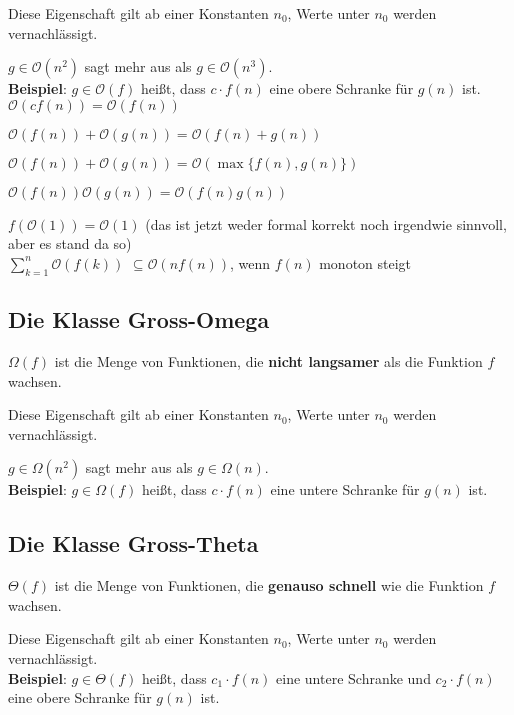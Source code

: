 \documentclass[12pt]{article}
\begin{document}
Diese Eigenschaft gilt ab einer Konstanten $n_0$, Werte unter $n_0$ werden vernachlässigt.

$g \in \mathcal O(n^2)$ sagt mehr aus als $g \in \mathcal O(n^3)$.\\

\textbf{Beispiel}: $g \in \mathcal O(f)$ heißt, dass $c \cdot{} f(n)$ eine obere Schranke für $g(n)$ ist.\\

$\mathcal O(cf(n)) = \mathcal O(f(n))$

$\mathcal O(f(n)) + \mathcal O(g(n)) = \mathcal O(f(n) + g(n))$

$\mathcal O(f(n)) + \mathcal O(g(n)) = \mathcal O(\max \{f(n), g(n)\})$

$\mathcal O(f(n))\mathcal O(g(n)) = \mathcal O(f(n)g(n))$

$f(\mathcal O(1)) = \mathcal O(1)$ (das ist jetzt weder formal korrekt noch irgendwie sinnvoll, aber es stand da so)\\

$\sum_{k=1}^n \mathcal O(f(k))$ $\subseteq \mathcal O(nf(n))$, wenn $f(n)$ monoton steigt

\subsection{Die Klasse Gross-Omega}

$\Omega(f)$ ist die Menge von Funktionen, die \textbf{nicht langsamer} als die Funktion $f$ wachsen.

Diese Eigenschaft gilt ab einer Konstanten $n_0$, Werte unter $n_0$ werden vernachlässigt.

$g \in \Omega(n^2)$ sagt mehr aus als $g \in \Omega(n)$.\\

\textbf{Beispiel}: $g \in \Omega(f)$ heißt, dass $c \cdot{} f(n)$ eine untere Schranke für $g(n)$ ist.\\

\subsection{Die Klasse Gross-Theta}

$\Theta(f)$ ist die Menge von Funktionen, die \textbf{genauso schnell} wie die Funktion $f$ wachsen.

Diese Eigenschaft gilt ab einer Konstanten $n_0$, Werte unter $n_0$ werden vernachlässigt.\\

\textbf{Beispiel}: $g \in \Theta(f)$ heißt, dass $c_1 \cdot{} f(n)$ eine untere Schranke und $c_2 \cdot{} f(n)$ eine obere Schranke für $g(n)$ ist.\\
\end{document}
